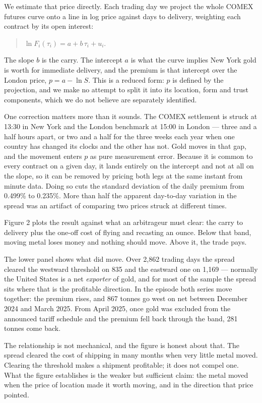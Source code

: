 \documentclass[11pt]{article}
\begin{document}
We estimate that price directly. Each trading day we project the whole COMEX
futures curve onto a line in log price against days to delivery, weighting each
contract by its open interest:
\begin{quote}
$\ln F_i(\tau_i) = a + b\,\tau_i + u_i$.
\end{quote}
The slope $b$ is the carry. The intercept $a$ is what the curve implies New York
gold is worth for immediate delivery, and the premium is that intercept over the
London price, $p = a - \ln S$. This is a reduced form: $p$ is defined by the
projection, and we make no attempt to split it into its location, form and trust
components, which we do not believe are separately identified.

One correction matters more than it sounds. The COMEX settlement is struck at
13:30 in New York and the London benchmark at 15:00 in London --- three and a
half hours apart, or two and a half for the three weeks each year when one
country has changed its clocks and the other has not. Gold moves in that gap,
and the movement enters $p$ as pure measurement error. Because it is common to
every contract on a given day, it lands entirely on the intercept and not at all
on the slope, so it can be removed by pricing both legs at the same instant from
minute data. Doing so cuts the standard deviation of the daily premium from
0.499\% to 0.235\%. More than half the apparent day-to-day variation in the
spread was an artifact of comparing two prices struck at different times.

Figure 2 plots the result against what an arbitrageur must clear: the carry to
delivery plus the one-off cost of flying and recasting an ounce. Below that
band, moving metal loses money and nothing should move. Above it, the trade
pays.

The lower panel shows what did move. Over 2,862 trading days the spread cleared
the westward threshold on 835 and the eastward one on 1,169 --- normally the
United States is a net \emph{exporter} of gold, and for most of the sample the
spread sits where that is the profitable direction. In the episode both series
move together: the premium rises, and 867 tonnes go west on net between December
2024 and March 2025. From April 2025, once gold was excluded from the announced
tariff schedule and the premium fell back through the band, 281 tonnes come
back.

The relationship is not mechanical, and the figure is honest about that. The
spread cleared the cost of shipping in many months when very little metal moved.
Clearing the threshold makes a shipment profitable; it does not compel one. What
the figure establishes is the weaker but sufficient claim: the metal moved when
the price of location made it worth moving, and in the direction that price
pointed.
\end{document}
